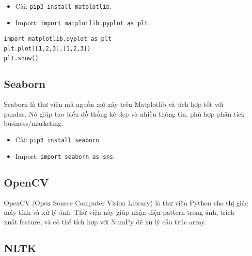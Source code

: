\begin{phuongphap}[title={Cài đặt/nhập}]
\begin{itemize}
  \item Cài: \texttt{pip3 install matplotlib}.
  \item Import: \texttt{import matplotlib.pyplot as plt}.
\end{itemize}
\end{phuongphap}

\begin{vidu}[title={Ví dụ: vẽ đường thẳng}]
\begin{lstlisting}
import matplotlib.pyplot as plt
plt.plot([1,2,3],[1,2,3])
plt.show()
\end{lstlisting}
\end{vidu}

\subsection{Seaborn}

\begin{dinhnghia}[title={Seaborn}]
Seaborn là thư viện mã nguồn mở xây trên Matplotlib và tích hợp tốt với pandas.
Nó giúp tạo biểu đồ thống kê đẹp và nhiều thông tin, phù hợp phân tích business/marketing.
\end{dinhnghia}

\begin{phuongphap}[title={Cài đặt/nhập}]
\begin{itemize}
  \item Cài: \texttt{pip3 install seaborn}.
  \item Import: \texttt{import seaborn as sns}.
\end{itemize}
\end{phuongphap}

\subsection{OpenCV}

\begin{dinhnghia}[title={OpenCV}]
OpenCV (Open Source Computer Vision Library) là thư viện Python cho thị giác máy tính và xử lý ảnh.
Thư viện này giúp nhận diện pattern trong ảnh, trích xuất feature, và có thể tích hợp với NumPy để xử lý cấu trúc array.
\end{dinhnghia}

\subsection{NLTK}

